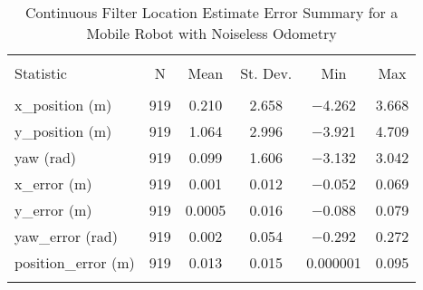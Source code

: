 
\begin{table}[htbp] \centering 
  \caption{Continuous Filter Location Estimate Error Summary for a Mobile Robot with Noiseless Odometry}
  \label{tab:one_mobile_noiseless_continuous_summary} 
\begin{tabular}{@{\extracolsep{5pt}}lccccc} 
\\[-1.8ex]\hline 
\hline \\[-1.8ex] 
Statistic & \multicolumn{1}{c}{N} & \multicolumn{1}{c}{Mean} & \multicolumn{1}{c}{St. Dev.} & \multicolumn{1}{c}{Min} & \multicolumn{1}{c}{Max} \\ 
\hline \\[-1.8ex] 
x\_position (m) & 919 & \num{0.210} & \num{2.658} & \num{-4.262} & \num{3.668} \\ 
y\_position (m) & 919 & \num{1.064} & \num{2.996} & \num{-3.921} & \num{4.709} \\ 
yaw (rad) & 919 & \num{0.099} & \num{1.606} & \num{-3.132} & \num{3.042} \\ 
x\_error (m) & 919 & \num{0.001} & \num{0.012} & \num{-0.052} & \num{0.069} \\ 
y\_error (m) & 919 & \num{0.0005} & \num{0.016} & \num{-0.088} & \num{0.079} \\ 
yaw\_error (rad) & 919 & \num{0.002} & \num{0.054} & \num{-0.292} & \num{0.272} \\ 
position\_error (m) & 919 & \num{0.013} & \num{0.015} & \num{0.000001} & \num{0.095} \\ 
\hline \\[-1.8ex] 
\end{tabular} 
\end{table} 
